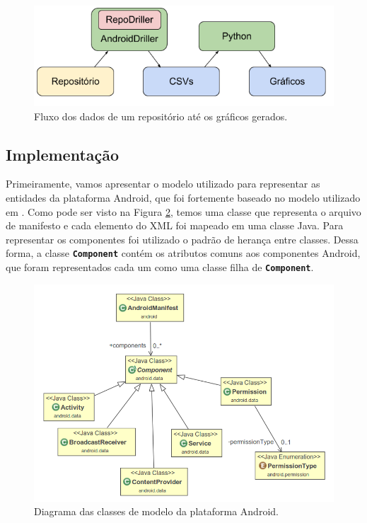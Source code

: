 \documentclass[a4paper,12pt]{article}
\begin{document}
 \begin{figure}[h]
 \centering
 \includegraphics[width=0.65\linewidth]{imgs/workflow.png}
 \caption{Fluxo dos dados de um repositório até os gráficos gerados.}
 \label{fig:workflow}
 \end{figure}



\subsection{Implementação}%
\label{sec:implementacao}


Primeiramente, vamos apresentar o modelo utilizado para representar as entidades da plataforma Android, que foi fortemente baseado no modelo utilizado em \cite{jptt}. Como pode ser visto na Figura \ref{fig:model}, temos uma classe que representa o arquivo de manifesto e cada elemento do XML foi mapeado em uma classe Java. Para representar os componentes foi utilizado o padrão de herança entre classes. Dessa forma, a classe {\small\texttt{\textbf{Component}}} contém os atributos comuns aos componentes Android, que foram representados cada um como uma classe filha de {\small\texttt{\textbf{Component}}}.\\

\begin{figure}[H]
\centering
\includegraphics[width=0.8\linewidth]{imgs/model.png}
\caption{Diagrama das classes de modelo da plataforma Android.}
\label{fig:model}
\end{figure}
\end{document}
